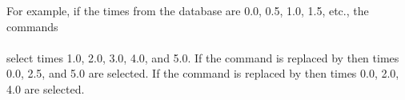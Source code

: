 \bigskip
For example, if the times from the database are 0.0, 0.5, 1.0, 1.5,
etc.\null, the commands
\cenlinesbegin
{} \\
 \\
\cenlinesend
select times 1.0, 2.0, 3.0, 4.0, and 5.0. If the  command is
replaced by
\cenlinesbegin
{}
\cenlinesend
then times 0.0, 2.5, and 5.0 are selected. If the  command is
replaced by
\cenlinesbegin
{}
\cenlinesend
then times 0.0, 2.0, 4.0 are selected.
